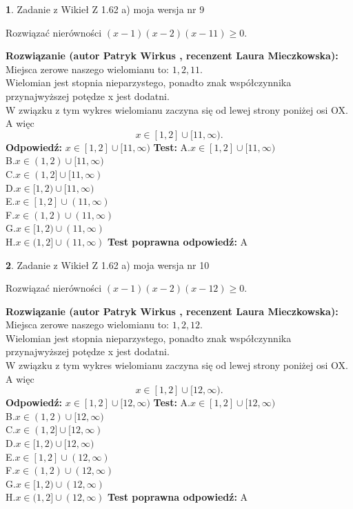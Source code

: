 \documentclass[12pt, a4paper]{article}
\theoremstyle{definition} %
\newtheorem{zad}{}
\newcommand{\zadStart}[1]{\begin{zad}#1\newline}
\newcommand{\zadStop}{\end{zad}}
\newcommand{\rozwStart}[2]{\noindent \textbf{Rozwiązanie (autor #1 , recenzent #2): }\newline}
\newcommand{\rozwStop}{\newline}
\newcommand{\odpStart}{\noindent \textbf{Odpowiedź:}\newline}
\newcommand{\odpStop}{\newline}
\newcommand{\testStart}{\noindent \textbf{Test:}\newline}
\newcommand{\testStop}{\newline}
\newcommand{\kluczStart}{\noindent \textbf{Test poprawna odpowiedź:}\newline}
\newcommand{\kluczStop}{\newline}
\begin{document}
\zadStart{Zadanie z Wikieł Z 1.62 a) moja wersja nr 9}

Rozwiązać nierówności $(x-1)(x-2)(x-11)\ge0$.
\zadStop
\rozwStart{Patryk Wirkus}{Laura Mieczkowska}
Miejsca zerowe naszego wielomianu to: $1, 2, 11$.\\
Wielomian jest stopnia nieparzystego, ponadto znak współczynnika przy\linebreak najwyższej potędze x jest dodatni.\\ W związku z tym wykres wielomianu zaczyna się od lewej strony poniżej osi OX. A więc $$x \in [1,2] \cup [11,\infty).$$
\rozwStop
\odpStart
$x \in [1,2] \cup [11,\infty)$
\odpStop
\testStart
A.$x \in [1,2] \cup [11,\infty)$\\
B.$x \in (1,2) \cup [11,\infty)$\\
C.$x \in (1,2] \cup [11,\infty)$\\
D.$x \in [1,2) \cup [11,\infty)$\\
E.$x \in [1,2] \cup (11,\infty)$\\
F.$x \in (1,2) \cup (11,\infty)$\\
G.$x \in [1,2) \cup (11,\infty)$\\
H.$x \in (1,2] \cup (11,\infty)$
\testStop
\kluczStart
A
\kluczStop



\zadStart{Zadanie z Wikieł Z 1.62 a) moja wersja nr 10}

Rozwiązać nierówności $(x-1)(x-2)(x-12)\ge0$.
\zadStop
\rozwStart{Patryk Wirkus}{Laura Mieczkowska}
Miejsca zerowe naszego wielomianu to: $1, 2, 12$.\\
Wielomian jest stopnia nieparzystego, ponadto znak współczynnika przy\linebreak najwyższej potędze x jest dodatni.\\ W związku z tym wykres wielomianu zaczyna się od lewej strony poniżej osi OX. A więc $$x \in [1,2] \cup [12,\infty).$$
\rozwStop
\odpStart
$x \in [1,2] \cup [12,\infty)$
\odpStop
\testStart
A.$x \in [1,2] \cup [12,\infty)$\\
B.$x \in (1,2) \cup [12,\infty)$\\
C.$x \in (1,2] \cup [12,\infty)$\\
D.$x \in [1,2) \cup [12,\infty)$\\
E.$x \in [1,2] \cup (12,\infty)$\\
F.$x \in (1,2) \cup (12,\infty)$\\
G.$x \in [1,2) \cup (12,\infty)$\\
H.$x \in (1,2] \cup (12,\infty)$
\testStop
\kluczStart
A
\kluczStop
\end{document}
